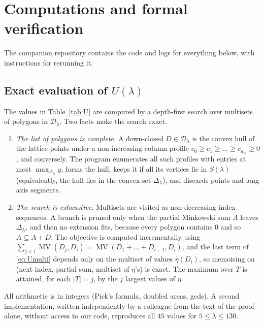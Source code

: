 \documentclass[11pt]{amsart}
\theoremstyle{definition}
\theoremstyle{remark}
\newcommand{\MV}{\operatorname{MV}}
\numberwithin{equation}{section}
\begin{document}
\section{Computations and formal verification}\label{app:code}

The companion repository \cite{repo} contains the code and logs for everything below, with
instructions for rerunning it.

\subsection*{\texorpdfstring{Exact evaluation of $U(\lambda)$}{Exact evaluation of U}}
The values in Table~\ref{tab:U} are computed by a depth-first search over multisets of
polygons in $\mathcal D_\lambda$. Two facts make the search exact.
\begin{enumerate}[label=(\alph*),nosep]
\item \emph{The list of polygons is complete.} A down-closed $D\in\mathcal D_\lambda$ is the
convex hull of the lattice points under a non-increasing column profile
$c_0\ge c_1\ge\dots\ge c_{w_x}\ge0$, and conversely. The program enumerates all such profiles
with entries at most $\max_{\Delta_\lambda}y$, forms the hull, keeps it if all its vertices lie in
$S(\lambda)$ (equivalently, the hull lies in the convex set $\Delta_\lambda$), and discards
points and long axis segments.
\item \emph{The search is exhaustive.} Multisets are visited as non-decreasing index sequences.
A branch is pruned only when the partial Minkowski sum $A$ leaves $\Delta_\lambda$, and then no
extension fits, because every polygon contains $0$ and so $A\subseteq A+D$. The objective is
computed incrementally using $\sum_{j<i}\MV(D_j,D_i)=\MV(D_1+\dots+D_{i-1},D_i)$, and the last
term of \eqref{eq:Umulti} depends only on the multiset of values $\eta(D_i)$, so memoising on
(next index, partial sum, multiset of $\eta$'s) is exact. The maximum over $T$ is attained, for
each $|T|=j$, by the $j$ largest values of $\eta$.
\end{enumerate}
All arithmetic is in integers (Pick's formula, doubled areas, gcds). A second implementation,
written independently by a colleague from the text of the proof alone, without access to our
code, reproduces all $45$ values for $5\le\lambda\le130$.
\end{document}
